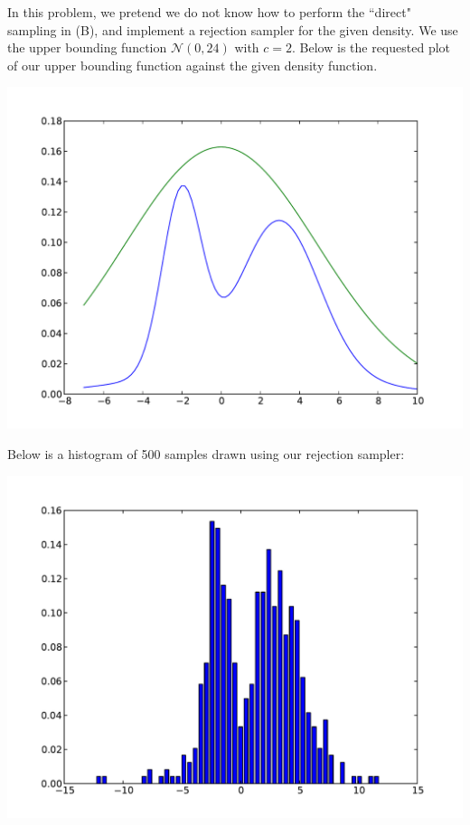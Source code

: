 \documentclass[solution, letterpaper]{cs121}
\begin{document}
\begin{empfile}
\subproblem %
In this problem, we pretend we do not know how to perform the ``direct" sampling in (B), and implement a rejection sampler for the given density. We use the upper bounding function $\mathcal{N}(0,24)$ with $c=2$. Below is the requested plot of our upper bounding function against the given density function.
\begin{center}
\includegraphics[scale=0.8]{mixture-w-envelope.pdf}
\end{center}

Below is a histogram of 500 samples drawn using our rejection sampler:
\begin{center}
\includegraphics[scale=0.8]{rejection-sample-histogram.pdf}
\end{center}


\end{empfile}
\end{document}
